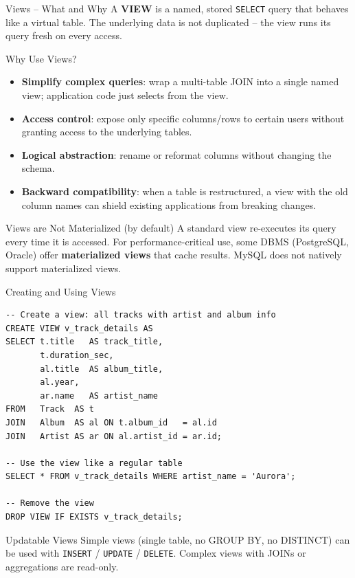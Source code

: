 \begin{frame}{Views -- What and Why}
  A \textbf{VIEW} is a named, stored \texttt{SELECT} query that behaves like a virtual table.
  The underlying data is not duplicated -- the view runs its query fresh on every access.

  \begin{block}{Why Use Views?}
    \begin{itemize}
      \item \textbf{Simplify complex queries}: wrap a multi-table JOIN into a single named view;
            application code just selects from the view.
      \item \textbf{Access control}: expose only specific columns/rows to certain users without
            granting access to the underlying tables.
      \item \textbf{Logical abstraction}: rename or reformat columns without changing the schema.
      \item \textbf{Backward compatibility}: when a table is restructured, a view with the old
            column names can shield existing applications from breaking changes.
    \end{itemize}
  \end{block}

  \begin{alertblock}{Views are Not Materialized (by default)}
    A standard view re-executes its query every time it is accessed. For performance-critical
    use, some DBMS (PostgreSQL, Oracle) offer \textbf{materialized views} that cache results.
    MySQL does not natively support materialized views.
  \end{alertblock}
\end{frame}

\begin{frame}[fragile]{Creating and Using Views}
  \begin{lstlisting}[style=sqlstyle]
-- Create a view: all tracks with artist and album info
CREATE VIEW v_track_details AS
SELECT t.title   AS track_title,
       t.duration_sec,
       al.title  AS album_title,
       al.year,
       ar.name   AS artist_name
FROM   Track  AS t
JOIN   Album  AS al ON t.album_id   = al.id
JOIN   Artist AS ar ON al.artist_id = ar.id;

-- Use the view like a regular table
SELECT * FROM v_track_details WHERE artist_name = 'Aurora';

-- Remove the view
DROP VIEW IF EXISTS v_track_details;
  \end{lstlisting}

  \begin{block}{Updatable Views}
    Simple views (single table, no GROUP BY, no DISTINCT) can be used with
    \texttt{INSERT} / \texttt{UPDATE} / \texttt{DELETE}. Complex views with JOINs
    or aggregations are read-only.
  \end{block}
\end{frame}

